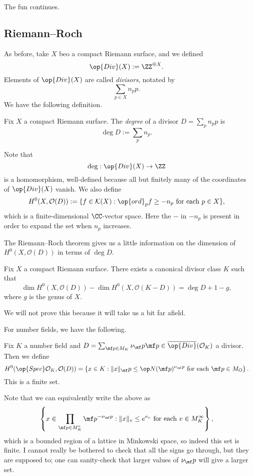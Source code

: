 \documentclass[../notes.tex]{subfiles}
\begin{document}

















The fun continues.

\subsection{Riemann--Roch}
As before, take $X$ beo a compact Riemann surface, and we defined
\[\op{Div}(X):=\ZZ^{\oplus X}.\]
Elements of $\op{Div}(X)$ are called \textit{divisors}, notated by
\[\sum_{p\in X}n_pp.\]
We have the following definition.
\begin{definition}[Degree]
	Fix $X$ a compact Riemann surface. The \textit{degree} of a divisor $D=\sum_pn_pp$ is
	\[\deg D:=\sum_pn_p.\]
\end{definition}
Note that
\[\deg:\op{Div}(X)\to\ZZ\]
is a homomorphism, well-defined because all but finitely many of the coordinates of $\op{Div}(X)$ vanish. We also define
\[H^0(X,\mathcal O(D)):=\{f\in\mathcal K(X):\op{ord}_pf\ge-n_p\text{ for each }p\in X\},\]
which is a finite-dimensional $\CC$-vector space. Here the $-$ in $-n_p$ is present in order to expand the set when $n_p$ increases.

The Riemann--Roch theorem gives us a little information on the dimension of $H^0(X,\mathcal O(D))$ in terms of $\deg D.$
\begin{theorem}
	Fix $X$ a compact Riemann surface. There exists a canonical divisor class $K$ such that
	\[\dim H^0(X,\mathcal O(D))-\dim H^0(X,\mathcal O(K-D))=\deg D+1-g,\]
	where $g$ is the genus of $X.$
\end{theorem}
We will not prove this because it will take us a bit far afield.

For number fields, we have the following.
\begin{defi}
	Fix $K$ a number field and $D=\sum_{\mf p\in M_K}\nu_\mf p\mf p\in\overline{\op{Div}}(\mathcal O_K)$ a divisor. Then we define
	\[H^0(\op{Spec}\mathcal O_K,\mathcal O(D))=\left\{x\in K:\lVert x\rVert_\mf p\le\op N(\mf p)^{\nu_\mf p}\text{ for each }\mf p\in M_O\right\}.\]
	This is a finite set.
\end{defi}
Note that we can equivalently write the above as
\[\left\{x\in\prod_{\mf p\in M_K^\circ}\mf p^{-\nu_\mf p}:\lVert x\rVert_v\le e^{\nu_v}\text{ for each }v\in M_K^\infty\right\},\]
which is a bounded region of a lattice in Minkowski space, so indeed this set is finite. I cannot really be bothered to check that all the signs go through, but they are supposed to; one can sanity-check that larger values of $\nu_\mf p$ will give a larger set.
\end{document}
